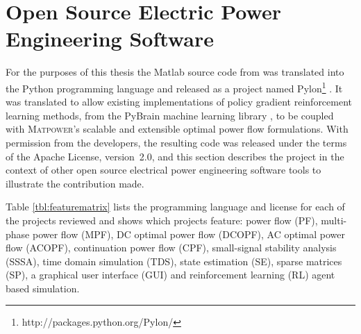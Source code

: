 \chapter{Open Source Electric Power Engineering Software}
\label{sec:oss}
For the purposes of this thesis the Matlab source code from \matpower was
translated into the Python programming language and released as a project named
Pylon\footnote{http://packages.python.org/Pylon/} \cite{lincoln:pyreto}. It was
translated to allow existing implementations of policy gradient reinforcement
learning methods, from the PyBrain machine learning library \cite{schaul:2010},
to be coupled with \textsc{Matpower}'s scalable and extensible optimal power
flow formulations. With permission from the \matpower developers, the resulting
code was released under the terms of the Apache License, version~2.0, and this
section describes the project in the context of other open source electrical
power engineering software tools to illustrate the contribution made.

Table \ref{tbl:featurematrix} lists the programming language and license
for each of the projects reviewed and shows which projects feature: power
flow (PF), multi-phase power flow (MPF), DC optimal power flow (DCOPF), AC optimal
power flow (ACOPF), continuation power flow (CPF), small-signal stability
analysis (SSSA), time domain simulation (TDS), state estimation (SE), sparse
matrices (SP), a graphical user interface (GUI) and reinforcement learning
(RL) agent based simulation.

